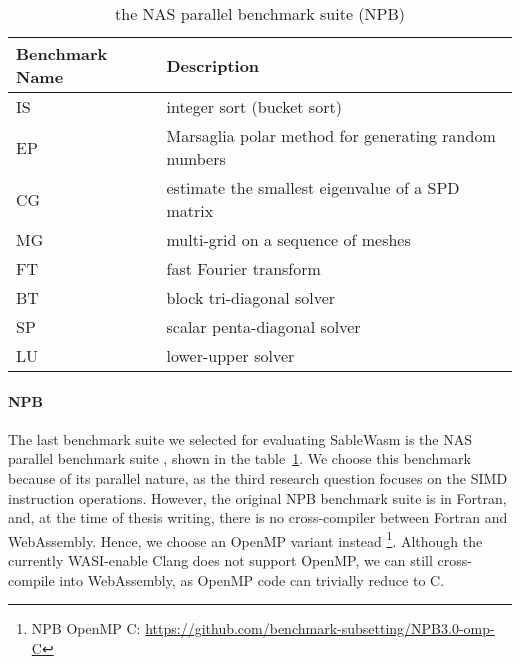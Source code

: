 \begin{table}
    \centering
    \begin{tabular}{|l|l|}
        \hline
        \textbf{Benchmark Name} & \textbf{Description}                                 \\ \hline
        IS                      & integer sort (bucket sort)                           \\ \hline
        EP                      & Marsaglia polar method for generating random numbers \\ \hline
        CG                      & estimate the smallest eigenvalue of a SPD matrix     \\ \hline
        MG                      & multi-grid on a sequence of meshes                   \\ \hline
        FT                      & fast Fourier transform                               \\ \hline
        BT                      & block tri-diagonal solver                            \\ \hline
        SP                      & scalar penta-diagonal solver                         \\ \hline
        LU                      & lower-upper solver                                   \\ \hline
    \end{tabular}
    \caption{the NAS parallel benchmark suite (NPB)}
    \label{tbl:npb}
\end{table}

\paragraph{NPB}
The last benchmark suite we selected for evaluating SableWasm is the NAS parallel benchmark suite \cite{npb}, shown in the table~\ref{tbl:npb}. We choose this benchmark because of its parallel nature, as the third research question focuses on the SIMD instruction operations. However, the original NPB benchmark suite is in Fortran, and, at the time of thesis writing, there is no cross-compiler between Fortran and WebAssembly. Hence, we choose an OpenMP variant instead \footnote{NPB OpenMP C: \url{https://github.com/benchmark-subsetting/NPB3.0-omp-C}}. Although the currently WASI-enable Clang does not support OpenMP, we can still cross-compile into WebAssembly, as OpenMP code can trivially reduce to C.